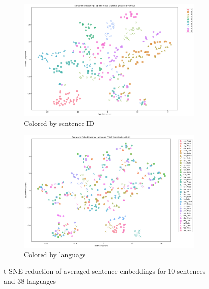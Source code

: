 \begin{figure}[ht]
    \centering
    \begin{subfigure}[b]{0.9\textwidth}

        \includegraphics[width=\textwidth]{chapters/images/by_id.png}
        \caption{Colored by sentence ID}
        \label{fig:10sentsalllangsbyid}
    \end{subfigure}
    \hfill
    \begin{subfigure}[b]{0.9\textwidth}

        \includegraphics[width=\textwidth]{chapters/images/by_lang.png}
        \caption{Colored by language}
        \label{fig:10sentsalllangsbylang}
    \end{subfigure}
    
    \caption{t-SNE reduction of averaged sentence embeddings for 10 sentences and 38 languages}
    \label{fig:bothimages}
\end{figure}


